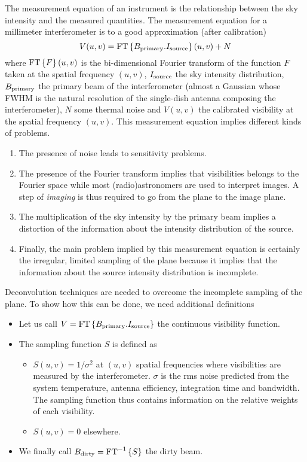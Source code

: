 The measurement equation of an instrument is the relationship between the
sky intensity and the measured quantities. The measurement equation for a
millimeter interferometer is to a good approximation (after calibration)
\begin{equation}
  V(u,v) = \mbox{FT}\displaystyle\left\{ B_{\mathrm{primary}}.I_{\mathrm{source}} \right\}(u,v)+N
\end{equation}
where $\mbox{FT}\displaystyle\left\{ F \right\}(u,v)$ is the bi-dimensional Fourier transform of
the function $F$ taken at the spatial frequency $(u,v)$, $I_{\mathrm{source}}$
the sky intensity distribution, $B_{\mathrm{primary}}$ the primary beam of the
interferometer (almost a Gaussian whose FWHM is the natural resolution of the
single-dish antenna composing the interferometer), $N$ some thermal noise
and $V(u,v)$ the calibrated visibility at the spatial frequency $(u,v)$.
This measurement equation implies different kinds of problems.
\begin{enumerate}
\item The presence of noise leads to sensitivity problems.
\item The presence of the Fourier transform implies that visibilities
  belongs to the Fourier space while most (radio)astronomers are used to
  interpret images. A step of \emph{imaging} is thus required to go
  from the \uv{} plane to the image plane.
\item The multiplication of the sky intensity by the primary beam implies a
  distortion of the information about the intensity distribution of the
  source.
\item Finally, the main problem implied by this measurement equation is
  certainly the irregular, limited sampling of the \uv{} plane because it
  implies that the information about the source intensity distribution is
  incomplete.
\end{enumerate}
Deconvolution techniques are needed to overcome the incomplete
sampling of the \uv{} plane. To show how this can be done, we need additional definitions
\begin{itemize}
\item Let us call $V = \mbox{FT}\displaystyle\left\{ B_{\mathrm{primary}}.I_{\mathrm{source}} \right\}$ the
  continuous visibility function.
\item The sampling function $S$ is defined as
  \begin{itemize}
  \item $S(u,v) = 1/\sigma^2$ at $(u,v)$ spatial frequencies where
    visibilities are measured by the interferometer. $\sigma{}$ is the rms
    noise predicted from the system temperature, antenna efficiency,
    integration time and bandwidth. The sampling function thus contains
    information on the relative weights of each visibility.
  \item $S(u,v) = 0$ elsewhere.
  \end{itemize}
\item We finally call $B_{\mathrm{dirty}} = \mbox{FT}^{-1} \displaystyle\left\{ S \right\}$ the dirty
  beam.
\end{itemize}
